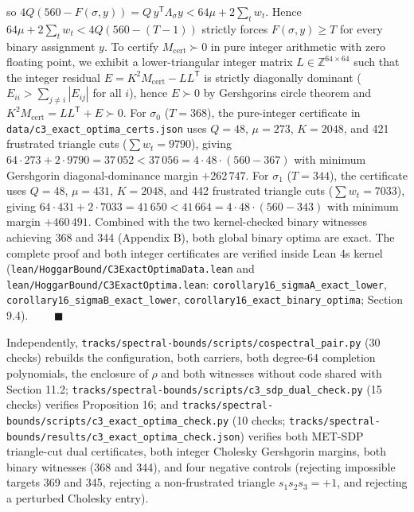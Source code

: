 \documentclass[11pt,a4paper]{article}
\newcommand{\lt}{<}
\newcommand{\gt}{>}
\begin{document}
so \(4 Q (560 - F(\sigma, y)) = Q\,y^{\mathsf T} \Lambda_\sigma y \lt 64\mu + 2 \sum_t w_t\). Hence
\(64\mu + 2 \sum_t w_t \lt 4 Q (560 - (T - 1))\) strictly forces \(F(\sigma, y) \ge T\) for every binary
assignment \(y\). To certify \(M_{\mathrm{cert}} \succ 0\) in pure integer arithmetic with zero floating
point, we exhibit a lower-triangular integer matrix \(L \in \mathbb{Z}^{64 \times 64}\) such that the
integer residual \(E = K^2 M_{\mathrm{cert}} - L L^{\mathsf T}\) is strictly diagonally dominant
(\(E_{ii} \gt \sum_{j \ne i} |E_{ij}|\) for all \(i\)), hence \(E \succ 0\) by Gershgorin\textquotesingle s circle theorem and
\(K^2 M_{\mathrm{cert}} = L L^{\mathsf T} + E \succ 0\).
For \(\sigma_0\) (\(T = 368\)), the pure-integer certificate in \nolinkurl{data/c3_exact_optima_certs.json} uses
\(Q = 48\), \(\mu = 273\), \(K = 2048\), and 421 frustrated triangle cuts (\(\sum w_t = 9790\)), giving
\(64 \cdot 273 + 2 \cdot 9790 = 37\,052 \lt 37\,056 = 4 \cdot 48 \cdot (560 - 367)\) with minimum Gershgorin
diagonal-dominance margin \(+262\,747\). For \(\sigma_1\) (\(T = 344\)), the certificate uses \(Q = 48\),
\(\mu = 431\), \(K = 2048\), and 442 frustrated triangle cuts (\(\sum w_t = 7033\)), giving
\(64 \cdot 431 + 2 \cdot 7033 = 41\,650 \lt 41\,664 = 4 \cdot 48 \cdot (560 - 343)\) with minimum margin
\(+460\,491\). Combined with the two kernel-checked binary witnesses achieving 368 and 344 (Appendix B),
both global binary optima are exact. The complete proof and both integer certificates are verified inside
Lean 4\textquotesingle s kernel (\nolinkurl{lean/HoggarBound/C3ExactOptimaData.lean} and \nolinkurl{lean/HoggarBound/C3ExactOptima.lean}:
\nolinkurl{corollary16_sigmaA_exact_lower}, \nolinkurl{corollary16_sigmaB_exact_lower}, \nolinkurl{corollary16_exact_binary_optima};
Section 9.4). \(\qquad\blacksquare\)

Independently, \nolinkurl{tracks/spectral-bounds/scripts/cospectral_pair.py} (30 checks) rebuilds the configuration, both carriers, both
degree-64 completion polynomials, the enclosure of \(\rho\) and both witnesses without code shared with
Section 11.2; \nolinkurl{tracks/spectral-bounds/scripts/c3_sdp_dual_check.py} (15 checks) verifies Proposition 16\textquotesingle; and
\nolinkurl{tracks/spectral-bounds/scripts/c3_exact_optima_check.py} (10 checks; \nolinkurl{tracks/spectral-bounds/results/c3_exact_optima_check.json}) verifies both
MET-SDP triangle-cut dual certificates, both integer Cholesky Gershgorin margins, both binary witnesses
(368 and 344), and four negative controls (rejecting impossible targets 369 and 345, rejecting a
non-frustrated triangle \(s_1 s_2 s_3 = +1\), and rejecting a perturbed Cholesky entry).
\end{document}
